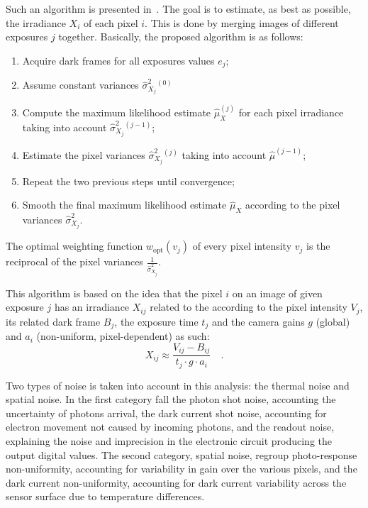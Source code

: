 \documentclass{report}
\begin{document}
Such an algorithm is presented in~\cite{Granados2010a}. The goal is to estimate, as best as possible, the irradiance $X_i$ of each pixel $i$. This is done by merging images of different exposures $j$ together. Basically, the proposed algorithm is as follows:
\begin{enumerate}
  \item{Acquire dark frames for all exposures values $e_j$;}
  \item{Assume constant variances $\hat{\sigma}_{X_j}^2{}^{(0)}$}
  \item{Compute the maximum likelihood estimate $\hat{\mu}_X^{(j)}$ for each pixel irradiance taking into account $\hat{\sigma}_{X_j}^2{}^{(j-1)}$;}
  \item{Estimate the pixel variances $\hat{\sigma}_{X_j}^2{}^{(j)}$ taking into account $\hat{\mu}^{(j-1)}$;}
  \item{Repeat the two previous steps until convergence;}
  \item{Smooth the final maximum likelihood estimate $\hat{\mu}_X$ according to the pixel variances $\hat{\sigma}_{X_j}^2$}.
\end{enumerate}

The optimal weighting function $w_{\mathrm{opt}}\left(v_j\right)$ of every pixel intensity $v_j$ is the reciprocal of the pixel variances $\frac{1}{\hat{\sigma}_{X_j}^2}$.

This algorithm is based on the idea that the pixel $i$ on an image of given exposure $j$ has an irradiance $X_{ij}$ related to the according to the pixel intensity $V_j$, its related dark frame $B_j$, the exposure time $t_j$ and the camera gains $g$ (global) and $a_i$ (non-uniform, pixel-dependent) as such:
\begin{equation}
\label{q7:eqirr}
X_{ij} \approx \frac{V_{ij} - B_{ij}}{t_j \cdot g \cdot a_i}
\quad.
\end{equation}

Two types of noise is taken into account in this analysis: the thermal noise and spatial noise. In the first category fall the photon shot noise, accounting the uncertainty of photons arrival, the dark current shot noise, accounting for electron movement not caused by incoming photons, and the readout noise, explaining the noise and imprecision in the electronic circuit producing the output digital values. The second category, spatial noise, regroup photo-response non-uniformity, accounting for variability in gain over the various pixels, and the dark current non-uniformity, accounting for dark current variability across the sensor surface due to temperature differences.
\end{document}
